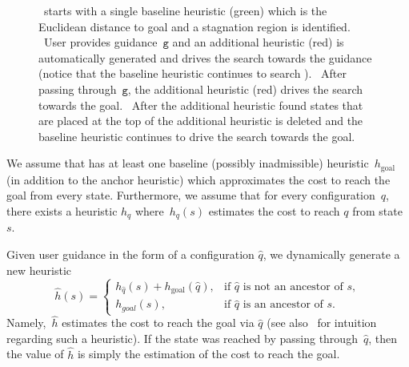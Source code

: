 \documentclass{article}
\begin{document}
\begin{figure}[t]
{    %
	~\mhastar starts with a single baseline heuristic (green) which is the Euclidean distance to goal and a stagnation region is identified.
	~User provides guidance~$\texttt{g}$ and an additional heuristic (red) is automatically generated and drives the search towards the guidance (notice that the baseline heuristic continues to search ).
	~After passing through~$\texttt{g}$, the additional heuristic (red) drives the search towards the goal.
	~After the additional heuristic found states that are placed at the top of  the additional heuristic is deleted and the baseline heuristic continues to drive the search towards the goal.
  }%
  \label{fig:filmstrip-dynamic_heuristic}%
  \vspace{-2.5mm}
\end{figure}



We assume that \mhastar has at least one baseline (possibly inadmissible) heuristic~$h_{\text{goal}}$ (in addition to the anchor heuristic) which approximates the cost to reach the goal from every state.
Furthermore, we assume that for every configuration~$q$, there exists a heuristic $h_q$ where~$h_q(s)$ estimates the cost to reach $q$ from state $s$.
%

Given user guidance in the form of a configuration $\hat{q}$, we dynamically generate a new heuristic $$
    \hat{h}(s)= 
\begin{cases}
    h_{\hat{q}}(s) + h_{\text{goal}}(\hat{q}),	& 
    		\text{if } \hat{q} \text{ is not an ancestor of } s,\\
    h_{{goal}}(s),            		& 
    		\text{if } \hat{q} \text{ is an ancestor of } s.
\end{cases}
$$
Namely,~$\hat{h}$ estimates the 
cost to reach the goal via $\hat{q}$ (see also~\cite{CGD86} for intuition regarding such a heuristic). 
If the state was reached by passing through~$\hat{q}$, then the value of $\hat{h}$ is simply the estimation of the cost to reach the goal.
\end{document}
